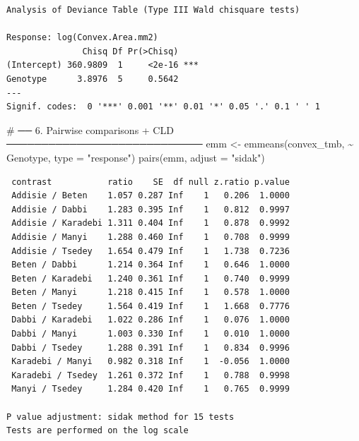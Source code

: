 \documentclass[
  letterpaper,
  DIV=11,
  numbers=noendperiod]{scrartcl}
\newenvironment{Shaded}{\begin{snugshade}}{\end{snugshade}}
\newcommand{\AttributeTok}[1]{\textcolor[rgb]{0.40,0.45,0.13}{#1}}
\newcommand{\CommentTok}[1]{\textcolor[rgb]{0.37,0.37,0.37}{#1}}
\newcommand{\FunctionTok}[1]{\textcolor[rgb]{0.28,0.35,0.67}{#1}}
\newcommand{\NormalTok}[1]{\textcolor[rgb]{0.00,0.23,0.31}{#1}}
\newcommand{\OtherTok}[1]{\textcolor[rgb]{0.00,0.23,0.31}{#1}}
\newcommand{\SpecialCharTok}[1]{\textcolor[rgb]{0.37,0.37,0.37}{#1}}
\newcommand{\StringTok}[1]{\textcolor[rgb]{0.13,0.47,0.30}{#1}}
\begin{document}
\begin{verbatim}
Analysis of Deviance Table (Type III Wald chisquare tests)

Response: log(Convex.Area.mm2)
               Chisq Df Pr(>Chisq)    
(Intercept) 360.9809  1     <2e-16 ***
Genotype      3.8976  5     0.5642    
---
Signif. codes:  0 '***' 0.001 '**' 0.01 '*' 0.05 '.' 0.1 ' ' 1
\end{verbatim}

\begin{Shaded}
\begin{Highlighting}[]
\CommentTok{\# ── 6. Pairwise comparisons + CLD ────────────────────────────}
\NormalTok{emm }\OtherTok{\textless{}{-}} \FunctionTok{emmeans}\NormalTok{(convex\_tmb, }\SpecialCharTok{\textasciitilde{}}\NormalTok{ Genotype, }\AttributeTok{type =} \StringTok{"response"}\NormalTok{)}
\FunctionTok{pairs}\NormalTok{(emm, }\AttributeTok{adjust =} \StringTok{"sidak"}\NormalTok{)}
\end{Highlighting}
\end{Shaded}

\begin{verbatim}
 contrast           ratio    SE  df null z.ratio p.value
 Addisie / Beten    1.057 0.287 Inf    1   0.206  1.0000
 Addisie / Dabbi    1.283 0.395 Inf    1   0.812  0.9997
 Addisie / Karadebi 1.311 0.404 Inf    1   0.878  0.9992
 Addisie / Manyi    1.288 0.460 Inf    1   0.708  0.9999
 Addisie / Tsedey   1.654 0.479 Inf    1   1.738  0.7236
 Beten / Dabbi      1.214 0.364 Inf    1   0.646  1.0000
 Beten / Karadebi   1.240 0.361 Inf    1   0.740  0.9999
 Beten / Manyi      1.218 0.415 Inf    1   0.578  1.0000
 Beten / Tsedey     1.564 0.419 Inf    1   1.668  0.7776
 Dabbi / Karadebi   1.022 0.286 Inf    1   0.076  1.0000
 Dabbi / Manyi      1.003 0.330 Inf    1   0.010  1.0000
 Dabbi / Tsedey     1.288 0.391 Inf    1   0.834  0.9996
 Karadebi / Manyi   0.982 0.318 Inf    1  -0.056  1.0000
 Karadebi / Tsedey  1.261 0.372 Inf    1   0.788  0.9998
 Manyi / Tsedey     1.284 0.420 Inf    1   0.765  0.9999

P value adjustment: sidak method for 15 tests 
Tests are performed on the log scale 
\end{verbatim}
\end{document}

